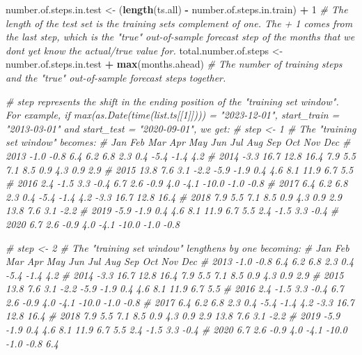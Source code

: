 \documentclass[
]{article}
\newenvironment{Shaded}{\begin{snugshade}}{\end{snugshade}}
\newcommand{\CommentTok}[1]{\textcolor[rgb]{0.56,0.35,0.01}{\textit{#1}}}
\newcommand{\DecValTok}[1]{\textcolor[rgb]{0.00,0.00,0.81}{#1}}
\newcommand{\FunctionTok}[1]{\textcolor[rgb]{0.13,0.29,0.53}{\textbf{#1}}}
\newcommand{\NormalTok}[1]{#1}
\newcommand{\OtherTok}[1]{\textcolor[rgb]{0.56,0.35,0.01}{#1}}
\newcommand{\SpecialCharTok}[1]{\textcolor[rgb]{0.81,0.36,0.00}{\textbf{#1}}}
\begin{document}
\begin{Shaded}
\begin{Highlighting}[]
\NormalTok{  number.of.steps.in.test }\OtherTok{\textless{}{-}}\NormalTok{ (}\FunctionTok{length}\NormalTok{(ts.all) }\SpecialCharTok{{-}}\NormalTok{ number.of.steps.in.train) }\SpecialCharTok{+} \DecValTok{1} \CommentTok{\# The length of the test set is the training set\textquotesingle{}s complement of one. The + 1 comes from the last step, which is the "true" out{-}of{-}sample forecast step of the months that we don\textquotesingle{}t yet know the actual/true value for.}
\NormalTok{  total.number.of.steps }\OtherTok{\textless{}{-}}\NormalTok{ number.of.steps.in.test }\SpecialCharTok{+} \FunctionTok{max}\NormalTok{(months.ahead) }\CommentTok{\# The number of training steps and the "true" out{-}of{-}sample forecast steps together.}

  \CommentTok{\# step represents the shift in the ending position of the "training set window". For example, if max(as.Date(time(list.ts[[1]]))) = "2023{-}12{-}01", start\_train = "2013{-}03{-}01" and start\_test = "2020{-}09{-}01", we get:}
  \CommentTok{\# step \textless{}{-} 1 \# The "training set window" becomes:}
  \CommentTok{\#       Jan   Feb   Mar   Apr   May   Jun   Jul   Aug   Sep   Oct   Nov   Dec}
  \CommentTok{\# 2013              {-}1.0  {-}0.8   6.4   6.2   6.8   2.3   0.4  {-}5.4  {-}1.4   4.2}
  \CommentTok{\# 2014  {-}3.3  16.7  12.8  16.4   7.9   5.5   7.1   8.5   0.9   4.3   0.9   2.9}
  \CommentTok{\# 2015  13.8   7.6   3.1  {-}2.2  {-}5.9  {-}1.9   0.4   4.6   8.1  11.9   6.7   5.5}
  \CommentTok{\# 2016   2.4  {-}1.5   3.3  {-}0.4   6.7   2.6  {-}0.9   4.0  {-}4.1 {-}10.0  {-}1.0  {-}0.8}
  \CommentTok{\# 2017   6.4   6.2   6.8   2.3   0.4  {-}5.4  {-}1.4   4.2  {-}3.3  16.7  12.8  16.4}
  \CommentTok{\# 2018   7.9   5.5   7.1   8.5   0.9   4.3   0.9   2.9  13.8   7.6   3.1  {-}2.2}
  \CommentTok{\# 2019  {-}5.9  {-}1.9   0.4   4.6   8.1  11.9   6.7   5.5   2.4  {-}1.5   3.3  {-}0.4}
  \CommentTok{\# 2020   6.7   2.6  {-}0.9   4.0  {-}4.1 {-}10.0  {-}1.0  {-}0.8}

  \CommentTok{\# step \textless{}{-} 2 \# The "training set window" lengthens by one becoming:}
  \CommentTok{\#         Jan   Feb   Mar   Apr   May   Jun   Jul   Aug   Sep   Oct   Nov   Dec}
  \CommentTok{\# 2013              {-}1.0  {-}0.8   6.4   6.2   6.8   2.3   0.4  {-}5.4  {-}1.4   4.2}
  \CommentTok{\# 2014  {-}3.3  16.7  12.8  16.4   7.9   5.5   7.1   8.5   0.9   4.3   0.9   2.9}
  \CommentTok{\# 2015  13.8   7.6   3.1  {-}2.2  {-}5.9  {-}1.9   0.4   4.6   8.1  11.9   6.7   5.5}
  \CommentTok{\# 2016   2.4  {-}1.5   3.3  {-}0.4   6.7   2.6  {-}0.9   4.0  {-}4.1 {-}10.0  {-}1.0  {-}0.8}
  \CommentTok{\# 2017   6.4   6.2   6.8   2.3   0.4  {-}5.4  {-}1.4   4.2  {-}3.3  16.7  12.8  16.4}
  \CommentTok{\# 2018   7.9   5.5   7.1   8.5   0.9   4.3   0.9   2.9  13.8   7.6   3.1  {-}2.2}
  \CommentTok{\# 2019  {-}5.9  {-}1.9   0.4   4.6   8.1  11.9   6.7   5.5   2.4  {-}1.5   3.3  {-}0.4}
  \CommentTok{\# 2020   6.7   2.6  {-}0.9   4.0  {-}4.1 {-}10.0  {-}1.0  {-}0.8   6.4}


\end{Highlighting}
\end{Shaded}
\end{document}
